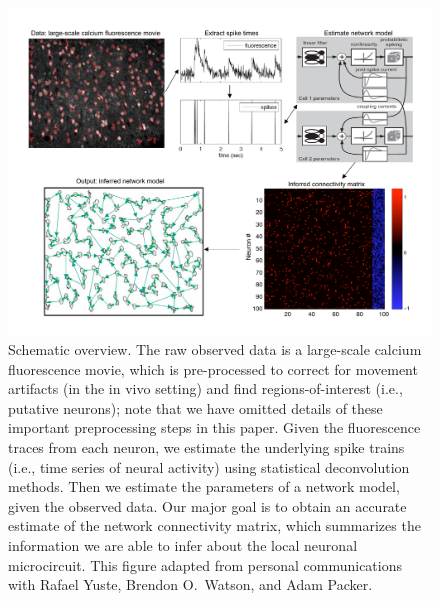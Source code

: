 \begin{figure}[t!]
\centering \includegraphics[width=\hsize]{../figs/yuri-paper-schematic}
\caption{Schematic overview. The raw observed data is a large-scale calcium fluorescence movie, which is pre-processed to correct for movement artifacts (in the in vivo setting) and find regions-of-interest (i.e., putative neurons); note that we have omitted details of these important preprocessing steps in this paper. Given the fluorescence traces from each neuron, we estimate the underlying spike trains (i.e., time series of neural activity) using statistical deconvolution methods. Then we estimate the parameters of a network model, given the observed data. Our major goal is to obtain an accurate estimate of the network connectivity matrix, which summarizes the information we are able to infer about the local neuronal microcircuit.  This figure adapted from personal communications with Rafael Yuste, Brendon O.\ Watson, and Adam Packer.}
\label{fig:data_schematic} \end{figure}

